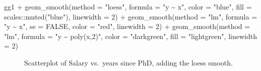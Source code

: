 \documentclass[
  letterpaper,
  10pt,
  krantz2]{krantz}
\makeatletter
\newenvironment{Shaded}{\begin{snugshade}}{\end{snugshade}}
\newcommand{\AttributeTok}[1]{\textcolor[rgb]{0.40,0.45,0.13}{#1}}
\newcommand{\ConstantTok}[1]{\textcolor[rgb]{0.56,0.35,0.01}{#1}}
\newcommand{\DecValTok}[1]{\textcolor[rgb]{0.68,0.00,0.00}{#1}}
\newcommand{\FunctionTok}[1]{\textcolor[rgb]{0.28,0.35,0.67}{#1}}
\newcommand{\NormalTok}[1]{\textcolor[rgb]{0.00,0.23,0.31}{#1}}
\newcommand{\SpecialCharTok}[1]{\textcolor[rgb]{0.37,0.37,0.37}{#1}}
\newcommand{\StringTok}[1]{\textcolor[rgb]{0.13,0.47,0.30}{#1}}
\newenvironment{kframe}{%
  \medskip{}
  \setlength{\fboxsep}{.8em}
  \def\at@end@of@kframe{}%
  \ifinner\ifhmode%
  \def\at@end@of@kframe{\end{minipage}}%
  \begin{minipage}{\columnwidth}%
  \fi\fi%
  \def\FrameCommand##1{\hskip\@totalleftmargin \hskip-\fboxsep
  \colorbox{shadecolor}{##1}\hskip-\fboxsep
      \hskip-\linewidth \hskip-\@totalleftmargin \hskip\columnwidth}%
  \MakeFramed {\advance\hsize-\width
    \@totalleftmargin\z@ \linewidth\hsize
    \@setminipage}}%
{\par\unskip\endMakeFramed%
  \at@end@of@kframe}
\renewenvironment{Shaded}{\begin{kframe}}{\end{kframe}}
\makeatother
\begin{document}
\begin{Shaded}
\begin{Highlighting}[]
\NormalTok{gg1 }\SpecialCharTok{+} 
  \FunctionTok{geom\_smooth}\NormalTok{(}\AttributeTok{method =} \StringTok{"loess"}\NormalTok{, }\AttributeTok{formula =} \StringTok{"y \textasciitilde{} x"}\NormalTok{, }
              \AttributeTok{color =} \StringTok{"blue"}\NormalTok{, }\AttributeTok{fill =}\NormalTok{ scales}\SpecialCharTok{::}\FunctionTok{muted}\NormalTok{(}\StringTok{"blue"}\NormalTok{),}
              \AttributeTok{linewidth =} \DecValTok{2}\NormalTok{) }\SpecialCharTok{+}
  \FunctionTok{geom\_smooth}\NormalTok{(}\AttributeTok{method =} \StringTok{"lm"}\NormalTok{, }\AttributeTok{formula =} \StringTok{"y \textasciitilde{} x"}\NormalTok{, }\AttributeTok{se =} \ConstantTok{FALSE}\NormalTok{,}
              \AttributeTok{color =} \StringTok{"red"}\NormalTok{,}
              \AttributeTok{linewidth =} \DecValTok{2}\NormalTok{) }\SpecialCharTok{+}
  \FunctionTok{geom\_smooth}\NormalTok{(}\AttributeTok{method =} \StringTok{"lm"}\NormalTok{, }\AttributeTok{formula =} \StringTok{"y \textasciitilde{} poly(x,2)"}\NormalTok{, }
              \AttributeTok{color =} \StringTok{"darkgreen"}\NormalTok{, }\AttributeTok{fill =} \StringTok{"lightgreen"}\NormalTok{,}
              \AttributeTok{linewidth =} \DecValTok{2}\NormalTok{) }
\end{Highlighting}
\end{Shaded}

\begin{figure}[H]


\caption{\label{fig-Salaries-loess}Scatterplot of Salary vs.~years since
PhD, adding the loess smooth.}

\end{figure}%
\end{document}
